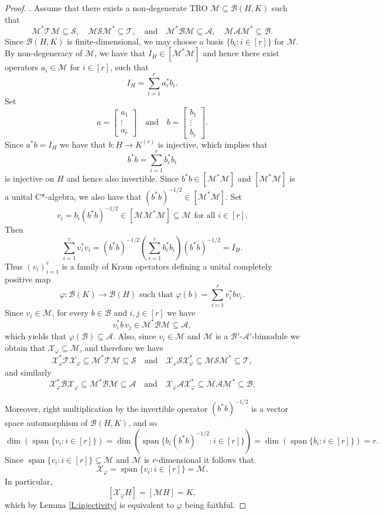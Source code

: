 \documentclass[11pt]{amsart}
\numberwithin{equation}{section}
\theoremstyle{plain}
\theoremstyle{definition}
\theoremstyle{remark}
\newcommand{\A}{{\mathcal{A}}}
\newcommand{\B}{{\mathcal{B}}}
\newcommand{\M}{{\mathcal{M}}}
\renewcommand{\S}{{\mathcal{S}}}
\newcommand{\T}{{\mathcal{T}}}
\newcommand{\X}{{\mathcal{X}}}
\newcommand\vphi{\varphi}
\newcommand{\foral}{\text{ for all }}
\newcommand{\qand}{\quad\text{and}\quad}
\newcommand{\spn}{\operatorname{span}}
\begin{document}
\begin{proof}
\noindent
[(i) $\Rightarrow$ (ii)].
Assume that there exists a non-degenerate TRO $\M\subseteq \B(H,K)$ such that
\[
\M^* \T \M \subseteq \S,\quad \M \S \M^* \subseteq \T,
\qand
\M^* \B \M \subseteq \A,\quad \M \A \M^* \subseteq \B.
\]
Since $\B(H,K)$ is finite-dimensional, we may choose a basis
$\{b_i:i\in[r]\}$ for $\M$. By non-degeneracy of $\M$, we have that
$I_H\in [\M^*\M]$ and hence there exist operators $a_i\in \M$ for $i\in [r]$, such that
\[
I_H=\sum_{i=1}^r a_i^*b_i.
\]
Set
\[
a=\begin{bmatrix}a_1\\ \vdots\\ a_r\end{bmatrix}
\qand
b=\begin{bmatrix}b_1\\ \vdots\\ b_r\end{bmatrix}.
\]
Since $a^*b=I_H$ we have that $b\colon H\to K^{(r)}$ is injective, which implies that
\[
b^*b=\sum_{i=1}^r b_i^*b_i
\]
is injective on $H$ and hence also invertible. Since $b^*b\in [\M^*\M]$ and $[\M^*\M]$ is a unital
C*-algebra, we also have that $(b^*b)^{-1/2}\in [\M^*\M]$.
Set
\[
v_i=b_i(b^*b)^{-1/2}\in [\M\M^*\M]\subseteq \M \foral i\in [r].
\]
Then
\[
\sum_{i=1}^r v_i^*v_i
=(b^*b)^{-1/2}(\sum_{i=1}^r b_i^*b_i)(b^*b)^{-1/2}
=I_H.
\]
Thus $(v_i)_{i=1}^r$ is a family of Kraus operators defining a unital completely positive map
\[
\vphi\colon \B(K)\to \B(H)\text{ such that } \vphi(b)=\sum_{i=1}^r v_i^*bv_i.
\]
Since $v_i\in \M$, for every
$b\in \B$ and $i,j\in [r]$ we have
\[
v_i^* b\, v_j \in \M^*\B\M\subseteq \A,
\]
which yields that $\vphi(\B)\subseteq \A$.
Also, since $v_i\in \M$ and $\M$ is a $\B'$-$\A'$-bimodule we obtain that $\X_\vphi\subseteq \M$, and therefore we have
\[
\X_\vphi^*\T \X_\vphi\subseteq \M^*\T\M\subseteq \S
\qand
\X_\vphi \S \X_\vphi^*\subseteq \M\S\M^*\subseteq \T,
\]
and similarly
\[
\X_\vphi^*\B \X_\vphi\subseteq \M^*\B\M\subseteq \A
\qand
\X_\vphi \A \X_\vphi^*\subseteq \M\A\M^*\subseteq \B.
\]

Moreover, right multiplication by the invertible operator $(b^*b)^{-1/2}$ is a
vector space automorphism of $\B(H,K)$, and so
\[
\dim(\spn\{v_i:i\in [r]\})
=
\dim(\spn\{b_i(b^*b)^{-1/2}:i\in [r]\})
=
\dim(\spn\{b_i:i\in [r]\})
=r.
\]
Since $\spn\{v_i:i\in [r]\}\subseteq \M$ and $\M$ is $r$-dimensional it follows that
\[
\X_\vphi=\spn\{v_i:i\in [r]\}=\M.
\]
In particular, 
\[
[\X_\vphi H]=[\M H]=K,
\]
which by Lemma \ref{L:injectivity} is equivalent to $\vphi$ being faithful.


\end{proof}
\end{document}
